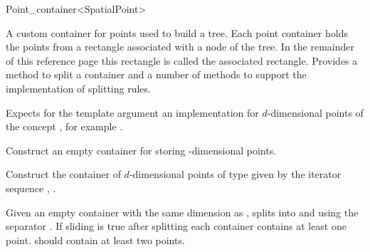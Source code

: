 

\begin{ccRefClass}{Point_container<SpatialPoint>}  %






\ccDefinition
A custom container for points used to build a tree. Each point container
holds the points from a rectangle associated with a node of the tree.
In the remainder of this reference page this rectangle is called the
associated rectangle.
Provides a method to split a container and a number of methods
to support the implementation of splitting rules.


\ccParameters

Expects for the template argument
an implementation for $d$-dimensional points
of the concept ,
for example .

\ccTypes


\ccCreation
{}

{
Construct an empty container for storing -dimensional points.
}

{
Construct the container of $d$-dimensional points of type 
given by the iterator sequence , .
}



\ccOperations

{Given an empty container  with the same dimension as , splits  into
 and  using the separator . If sliding is true after splitting 
each container contains at least one point.  should contain at least two points.}



\end{ccRefClass}
